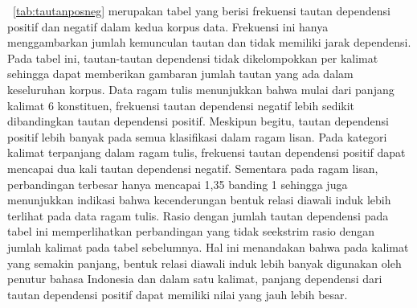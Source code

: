 \tab~\ref{tab:tautanposneg} merupakan tabel yang berisi frekuensi tautan dependensi positif dan negatif dalam kedua korpus data. Frekuensi ini hanya menggambarkan jumlah kemunculan tautan dan tidak memiliki jarak dependensi. Pada tabel ini, tautan-tautan dependensi tidak dikelompokkan per kalimat sehingga dapat memberikan gambaran jumlah tautan yang ada dalam keseluruhan korpus. Data ragam tulis menunjukkan bahwa mulai dari panjang kalimat 6 konstituen, frekuensi tautan dependensi negatif lebih sedikit dibandingkan tautan dependensi positif. Meskipun begitu, tautan dependensi positif lebih banyak pada semua klasifikasi dalam ragam lisan. Pada kategori kalimat terpanjang dalam ragam tulis, frekuensi tautan dependensi positif dapat mencapai dua kali tautan dependensi negatif. Sementara pada ragam lisan, perbandingan terbesar hanya mencapai 1,35 banding 1 sehingga juga menunjukkan indikasi bahwa kecenderungan bentuk relasi diawali induk lebih terlihat pada data ragam tulis. Rasio dengan jumlah tautan dependensi pada tabel ini memperlihatkan perbandingan yang tidak seekstrim rasio dengan jumlah kalimat pada tabel sebelumnya. Hal ini menandakan bahwa pada kalimat yang semakin panjang, bentuk relasi diawali induk lebih banyak digunakan oleh penutur bahasa Indonesia dan dalam satu kalimat, panjang dependensi dari tautan dependensi positif dapat memiliki nilai yang jauh lebih besar.

